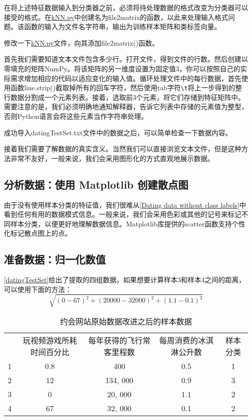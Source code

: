 在将上述特征数据输入到分类器之前，必须将待处理数据的格式改变为分类器可以接受的格式。在\href{https://github.com/JPL-JUNO/Machine-Learning-in-Action/blob/main/Codes/kNN.py}{kNN.py}中创建名为file2matrix的函数，以此来处理输入格式问题。该函数的输入为文件名字符串，输出为训练样本矩阵和类标签向量。

修改一下\href{https://github.com/JPL-JUNO/Machine-Learning-in-Action/blob/main/Codes/kNN.py}{kNN.py}文件，向其添加file2matrix()函数。

首先我们需要知道文本文件包含多少行。打开文件，得到文件的行数。然后创建以零填充的矩阵NumPy。将该矩阵的另一维度设置为固定值3，你可以按照自己的实际需求增加相应的代码以适应变化的输入值。循环处理文件中的每行数据，首先使用函数line.strip()截取掉所有的回车字符，然后使用tab字符\verb|\t|将上一步得到的整行数据分割成一个元素列表。接着，选取前3个元素，将它们存储到特征矩阵中。需要注意的是，我们必须明确地通知解释器，告诉它列表中存储的元素值为整型，否则Python语言会将这些元素当作字符串处理。

成功导入datingTestSet.txt文件中的数据之后，可以简单检查一下数据内容。

接着我们需要了解数据的真实含义。当然我们可以直接浏览文本文件，但是这种方法非常不友好，一般来说，我们会采用图形化的方式直观地展示数据。

\subsection{分析数据：使用 Matplotlib 创建散点图}

由于没有使用样本分类的特征值，我们很难从\autoref{Dating data without class labels}中看到任何有用的数据模式信息。一般来说，我们会采用色彩或其他的记号来标记不同样本分类，以便更好地理解数据信息。Matplotlib库提供的scatter函数支持个性化标记散点图上的点。

\subsection{准备数据：归一化数值}
\autoref{datingTestSet}给出了提取的四组数据，如果想要计算样本3和样本4之间的距离，可以使用下面的方法：
$$\sqrt{(0-67)^2 + (20000-32000)^2+(1.1-0.1)^2}$$
\begin{table}[H]
    \centering
    \caption{约会网站原始数据改进之后的样本数据}
    \label{datingTestSet}
    \begin{tabular}{ccccc}
        \hline
          & 玩视频游戏所耗时间百分比 & 每年获得的飞行常客里程数 & 每周消费的冰淇淋公升数 & 样本分类 \\
        1 & 0.8          & 400          & 0.5         & 1    \\
        2 & 12           & 134, 000     & 0.9         & 3    \\
        3 & 0            & 20, 000      & 1.1         & 2    \\
        4 & 67           & 32, 000      & 0.1         & 2    \\
        \hline
    \end{tabular}
\end{table}

